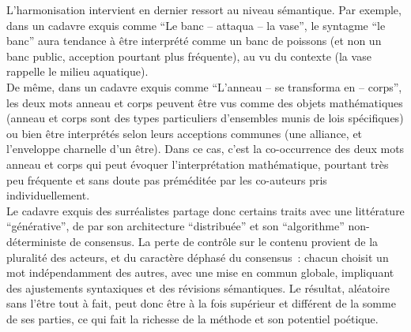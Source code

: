 \documentclass{article}
\begin{document}
				L'harmonisation intervient en dernier ressort au niveau sémantique. Par exemple, dans un cadavre exquis comme ``Le banc -- attaqua -- la vase'', le syntagme ``le banc'' aura tendance à être interprété comme un banc de poissons (et non un banc public, acception pourtant plus fréquente), au vu du contexte (la vase rappelle le milieu aquatique).\\
				De même, dans un cadavre exquis comme ``L'anneau -- se transforma en -- corps'', les deux mots anneau et corps peuvent être vus comme des objets mathématiques (anneau et corps sont des types particuliers d'ensembles munis de lois spécifiques) ou bien être interprétés selon leurs acceptions communes (une alliance, et l'enveloppe charnelle d'un être). Dans ce cas, c'est la co-occurrence des deux mots anneau et corps qui peut évoquer l'interprétation mathématique, pourtant très peu fréquente et sans doute pas préméditée par les co-auteurs pris individuellement.\\
				
				Le cadavre exquis des surréalistes partage donc certains traits avec une littérature ``générative'', de par son architecture ``distribuée'' et son ``algorithme'' non-déterministe de consensus. La perte de contrôle sur le contenu provient de la pluralité des acteurs, et du caractère déphasé du consensus~: chacun choisit un mot indépendamment des autres, avec une mise en commun globale, impliquant des ajustements syntaxiques et des révisions sémantiques. Le résultat, aléatoire sans l'être tout à fait, peut donc être à la fois supérieur et différent de la somme de ses parties, ce qui fait la richesse de la méthode et son potentiel poétique.
				
\end{document}
